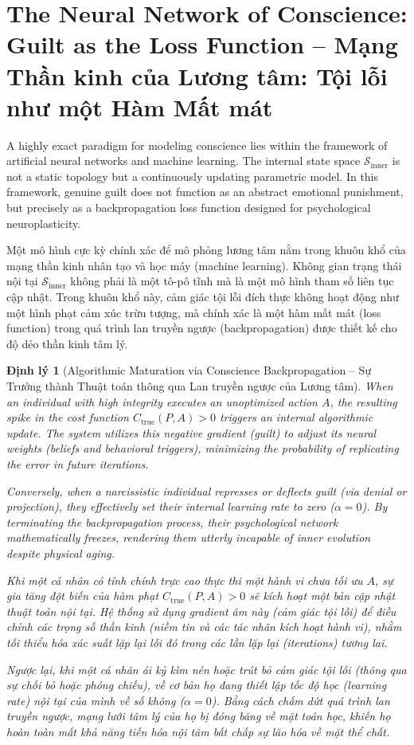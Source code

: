 \documentclass{report}
\newtheorem{dinhly}{Định lý}
\begin{document}
\section{The Neural Network of Conscience: Guilt as the Loss Function -- Mạng Thần kinh của Lương tâm: Tội lỗi như một Hàm Mất mát}

A highly exact paradigm for modeling conscience lies within the framework of artificial neural networks and machine learning. The internal state space $\mathcal{S}_{\text{inner}}$ is not a static topology but a continuously updating parametric model. In this framework, genuine guilt does not function as an abstract emotional punishment, but precisely as a backpropagation loss function designed for psychological neuroplasticity.

Một mô hình cực kỳ chính xác để mô phỏng lương tâm nằm trong khuôn khổ của mạng thần kinh nhân tạo và học máy (machine learning). Không gian trạng thái nội tại $\mathcal{S}_{\text{inner}}$ không phải là một tô-pô tĩnh mà là một mô hình tham số liên tục cập nhật. Trong khuôn khổ này, cảm giác tội lỗi đích thực không hoạt động như một hình phạt cảm xúc trừu tượng, mà chính xác là một hàm mất mát (loss function) trong quá trình lan truyền ngược (backpropagation) được thiết kế cho độ dẻo thần kinh tâm lý.

\begin{dinhly}[Algorithmic Maturation via Conscience Backpropagation -- Sự Trưởng thành Thuật toán thông qua Lan truyền ngược của Lương tâm]
	When an individual with high integrity executes an unoptimized action $A$, the resulting spike in the cost function $C_{\text{true}}(P,A) > 0$ triggers an internal algorithmic update. The system utilizes this negative gradient (guilt) to adjust its neural weights (beliefs and behavioral triggers), minimizing the probability of replicating the error in future iterations. 
	
	Conversely, when a narcissistic individual represses or deflects guilt (via denial or projection), they effectively set their internal learning rate to zero ($\alpha = 0$). By terminating the backpropagation process, their psychological network mathematically freezes, rendering them utterly incapable of inner evolution despite physical aging.
	
	Khi một cá nhân có tính chính trực cao thực thi một hành vi chưa tối ưu $A$, sự gia tăng đột biến của hàm phạt $C_{\text{true}}(P,A) > 0$ sẽ kích hoạt một bản cập nhật thuật toán nội tại. Hệ thống sử dụng gradient âm này (cảm giác tội lỗi) để điều chỉnh các trọng số thần kinh (niềm tin và các tác nhân kích hoạt hành vi), nhằm tối thiểu hóa xác suất lặp lại lỗi đó trong các lần lặp lại (iterations) tương lai.
	
	Ngược lại, khi một cá nhân ái kỷ kìm nén hoặc trút bỏ cảm giác tội lỗi (thông qua sự chối bỏ hoặc phóng chiếu), về cơ bản họ đang thiết lập tốc độ học (learning rate) nội tại của mình về số không ($\alpha = 0$). Bằng cách chấm dứt quá trình lan truyền ngược, mạng lưới tâm lý của họ bị đóng băng về mặt toán học, khiến họ hoàn toàn mất khả năng tiến hóa nội tâm bất chấp sự lão hóa về mặt thể chất.
\end{dinhly}
\end{document}
